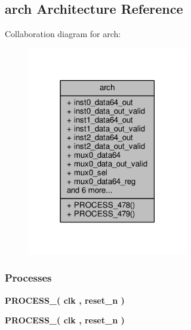 \subsection{arch Architecture Reference}
\label{classbit__unpack_1_1arch}


Collaboration diagram for arch\+:\nopagebreak
\begin{figure}[H]
\begin{center}
\leavevmode
\includegraphics[width=198pt]{d0/d27/classbit__unpack_1_1arch__coll__graph}
\end{center}
\end{figure}
\subsubsection*{Processes}
 \begin{DoxyCompactItemize}
\item 
{\bf P\+R\+O\+C\+E\+S\+S\+\_}{\bfseries  ( {\bfseries {\bfseries {\bf clk}} \textcolor{vhdlchar}{ }} , {\bfseries {\bfseries {\bf reset\+\_\+n}} \textcolor{vhdlchar}{ }} )}
\item 
{\bf P\+R\+O\+C\+E\+S\+S\+\_}{\bfseries  ( {\bfseries {\bfseries {\bf clk}} \textcolor{vhdlchar}{ }} , {\bfseries {\bfseries {\bf reset\+\_\+n}} \textcolor{vhdlchar}{ }} )}
\end{DoxyCompactItemize}
